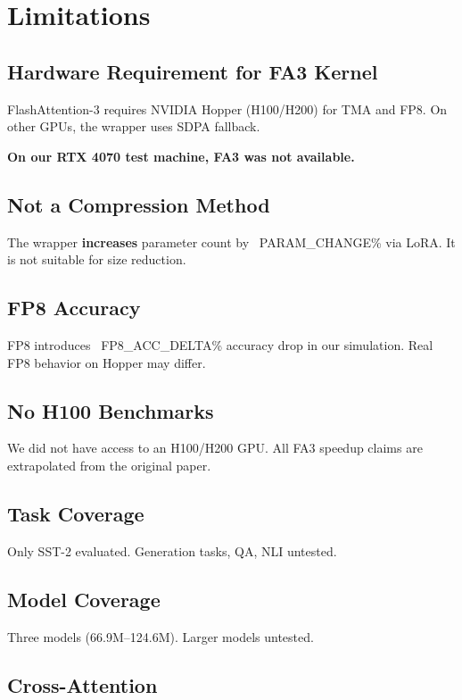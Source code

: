 \section{Limitations}

\subsection{Hardware Requirement for FA3 Kernel}

FlashAttention-3 requires NVIDIA Hopper (H100/H200) for TMA and FP8. 
On other GPUs, the wrapper uses SDPA fallback.

\textbf{On our RTX 4070 test machine, FA3 was not available.}

\subsection{Not a Compression Method}

The wrapper \textbf{increases} parameter count by ~{{PARAM\_CHANGE}}\% via LoRA. 
It is not suitable for size reduction.

\subsection{FP8 Accuracy}

FP8 introduces ~{{FP8\_ACC\_DELTA}}\% accuracy drop in our simulation. Real 
FP8 behavior on Hopper may differ.

\subsection{No H100 Benchmarks}

We did not have access to an H100/H200 GPU. All FA3 speedup claims are 
extrapolated from the original paper.

\subsection{Task Coverage}

Only SST-2 evaluated. Generation tasks, QA, NLI untested.

\subsection{Model Coverage}

Three models (66.9M--124.6M). Larger models untested.

\subsection{Cross-Attention}

